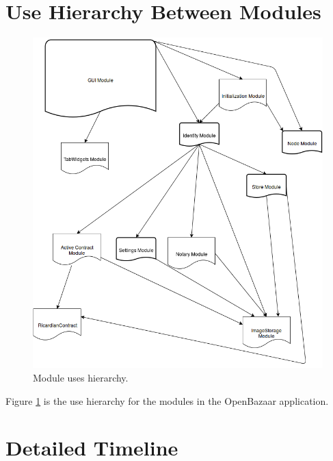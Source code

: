 \documentclass{article}
\begin{document}
\section*{Use Hierarchy Between Modules}
\begin{figure}
\includegraphics[scale=0.5]{use_hierarchy}
\caption{Module uses hierarchy.}
\label{uses_hierarchy}
\end{figure}

Figure \ref{uses_hierarchy} is the use hierarchy for the modules in the OpenBazaar application.
\section*{Detailed Timeline}
\end{document}
